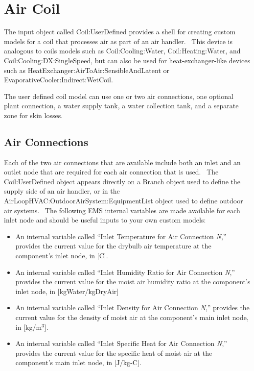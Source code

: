 \section{Air Coil}\label{air-coil}

The input object called Coil:UserDefined provides a shell for creating custom models for a coil that processes air as part of an air handler.~ This device is analogous to coils models such as Coil:Cooling:Water, Coil:Heating:Water, and Coil:Cooling:DX:SingleSpeed, but can also be used for heat-exchanger-like devices such as HeatExchanger:AirToAir:SensibleAndLatent or EvaporativeCooler:Indirect:WetCoil.

The user defined coil model can use one or two air connections, one optional plant connection, a water supply tank, a water collection tank, and a separate zone for skin losses.

\subsection{Air Connections}\label{air-connections}

Each of the two air connections that are available include both an inlet and an outlet node that are required for each air connection that is used.~ The Coil:UserDefined object appears directly on a Branch object used to define the supply side of an air handler, or in the AirLoopHVAC:OutdoorAirSystem:EquipmentList object used to define outdoor air systems.~ The following EMS internal variables are made available for each inlet node and should be useful inputs to your own custom models:

\begin{itemize}
\item
  An internal variable called ``Inlet Temperature for Air Connection \emph{N},'' provides the current value for the drybulb air temperature at the component's inlet node, in {[}C{]}.
\item
  An internal variable called ``Inlet Humidity Ratio for Air Connection \emph{N},'' provides the current value for the moist air humidity ratio at the component's inlet node, in {[}kgWater/kgDryAir{]}
\item
  An internal variable called ``Inlet Density for Air Connection \emph{N},'' provides the current value for the density of moist air at the component's main inlet node, in {[}kg/m\(^{3}\){]}.
\item
  An internal variable called ``Inlet Specific Heat for Air Connection \emph{N},'' provides the current value for the specific heat of moist air at the component's main inlet node, in {[}J/kg-C{]}.
\end{itemize}


